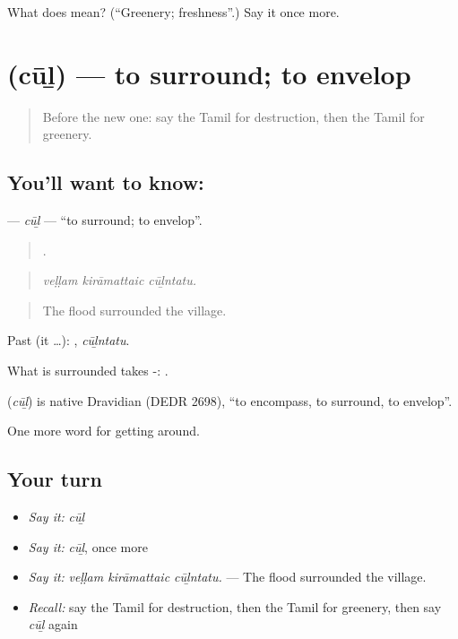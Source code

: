 \begin{tcolorbox}[breakable,colback=teal!4,colframe=teal!35!black,title={Before you move on}]
What does  mean? (\textquotedblleft{}Greenery; freshness\textquotedblright{}.) Say it once more.
\end{tcolorbox}
\section[\texorpdfstring{\ta{சூழ்} (cūḻ)}{சூழ் (cūḻ)}]{ (cūḻ) — to surround; to envelop}

\label{lesson:TA-C442-cul}



\begin{quote}
Before the new one: say the Tamil for destruction, then the Tamil for greenery.
\end{quote}

\subsection*{You'll want to know: }
\textbf{} — \emph{cūḻ} — \textquotedblleft{}to surround; to envelop\textquotedblright{}.

\begin{quote}
  .
\end{quote}

\begin{quote}
\emph{veḷḷam kirāmattaic cūḻntatu.}
\end{quote}

\begin{quote}
The flood surrounded the village.
\end{quote}

Past (it …): , \emph{cūḻntatu}.

What is surrounded takes -:  .

\begin{cousinweb}
\textbf{} (\emph{cūḻ}) is native Dravidian (DEDR 2698), \textquotedblleft{}to encompass, to surround, to envelop\textquotedblright{}.
\end{cousinweb}

\begin{grammarlens}[title={What you've built}]
One more word for getting around.
\end{grammarlens}

\subsection*{Your turn}
\begin{itemize}
\raggedright
  \item \emph{Say it:} \emph{cūḻ}
  \item \emph{Say it:} \emph{cūḻ}, once more
  \item \emph{Say it:} \emph{veḷḷam kirāmattaic cūḻntatu.} — The flood surrounded the village.
  \item \emph{Recall:} say the Tamil for destruction, then the Tamil for greenery, then say \emph{cūḻ} again
\end{itemize}

